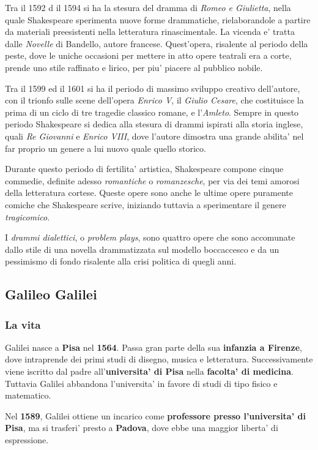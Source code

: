 \documentclass{article}
\begin{document}
{{    Tra il 1592 d il 1594 si ha la stesura del dramma di \textit{Romeo e Giulietta}, nella quale Shakespeare sperimenta nuove forme drammatiche, rielaborandole a partire da materiali preesistenti nella letteratura rinascimentale. La vicenda e' tratta dalle \textit{Novelle} di Bandello, autore francese. Quest'opera, risalente al periodo della peste, dove le uniche occasioni per mettere in atto opere teatrali era a corte, prende uno stile raffinato e lirico, per piu' piacere al pubblico nobile.

    Tra il 1599 ed il 1601 si ha il periodo di massimo sviluppo creativo dell'autore, con il trionfo sulle scene dell'opera \textit{Enrico V}, il \textit{Giulio Cesare}, che costituisce la prima di un ciclo di tre tragedie classico romane, e l'\textit{Amleto}. Sempre in questo periodo Shakespeare si dedica alla stesura di drammi ispirati alla storia inglese, quali \textit{Re Giovanni} e \textit{Enrico VIII}, dove l'autore dimostra una grande abilita' nel far proprio un genere a lui nuovo quale quello storico.

    Durante questo periodo di fertilita' artistica, Shakespeare compone cinque commedie, definite adesso \textit{romantiche} o \textit{romanzesche}, per via dei temi amorosi della letteratura cortese. Queste opere sono anche le ultime opere puramente comiche che Shakespeare scrive, iniziando tuttavia a sperimentare il genere \textit{tragicomico}.

    I \textit{drammi dialettici}, o \textit{problem plays}, sono quattro opere che sono accomunate dallo stile di una novella drammatizzata sul modello boccaccesco e da un pessimismo di fondo risalente alla crisi politica di quegli anni.

    \subsection{Galileo Galilei}
    \subsubsection{La vita} %
    Galilei nasce a \textbf{Pisa} nel \textbf{1564}. Passa gran parte della sua \textbf{infanzia a Firenze}, dove intraprende dei primi studi di disegno, musica e letteratura. Successivamente viene iscritto dal padre all'\textbf{universita' di Pisa} nella \textbf{facolta' di medicina}. Tuttavia Galilei abbandona l'universita' in favore di studi di tipo fisico e matematico.

    Nel \textbf{1589}, Galilei ottiene un incarico come \textbf{professore presso l'universita' di Pisa}, ma si trasferi' presto a \textbf{Padova}, dove ebbe una maggior liberta' di espressione.

}}
\end{document}
